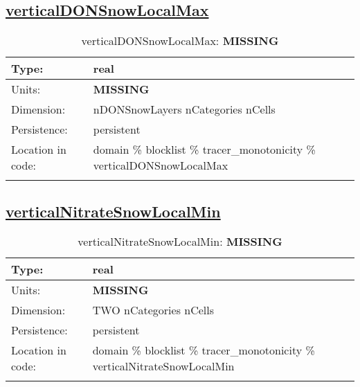 \subsection[verticalDONSnowLocalMax]{\hyperref[sec:var_tab_tracer_monotonicity]{verticalDONSnowLocalMax}}
\label{subsec:var_sec_tracer_monotonicity_verticalDONSnowLocalMax}
\begin{center}
\begin{longtable}{| p{2.0in} | p{4.0in} |}
        \hline 
        Type: & real \\
        \hline 
        Units: & {\bf \color{red} MISSING} \\
        \hline 
        Dimension: & nDONSnowLayers nCategories nCells \\
        \hline 
        Persistence: & persistent \\
        \hline 
         Location in code: & domain \% blocklist \% tracer\_monotonicity \% verticalDONSnowLocalMax \\
         \hline 
    \caption{verticalDONSnowLocalMax: {\bf \color{red} MISSING}}
\end{longtable}
\end{center}
\subsection[verticalNitrateSnowLocalMin]{\hyperref[sec:var_tab_tracer_monotonicity]{verticalNitrateSnowLocalMin}}
\label{subsec:var_sec_tracer_monotonicity_verticalNitrateSnowLocalMin}
\begin{center}
\begin{longtable}{| p{2.0in} | p{4.0in} |}
        \hline 
        Type: & real \\
        \hline 
        Units: & {\bf \color{red} MISSING} \\
        \hline 
        Dimension: & TWO nCategories nCells \\
        \hline 
        Persistence: & persistent \\
        \hline 
         Location in code: & domain \% blocklist \% tracer\_monotonicity \% verticalNitrateSnowLocalMin \\
         \hline 
    \caption{verticalNitrateSnowLocalMin: {\bf \color{red} MISSING}}
\end{longtable}
\end{center}
